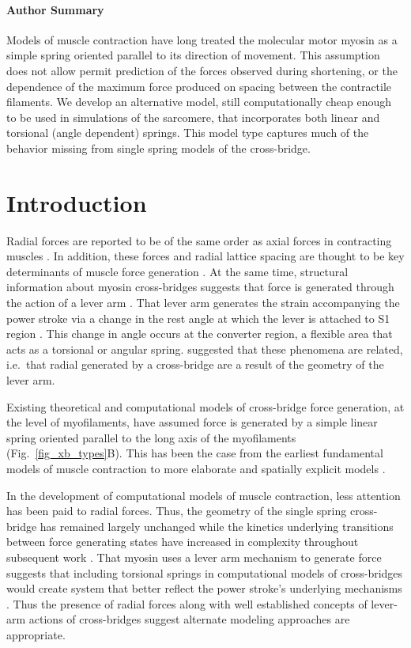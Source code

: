 \documentclass[]{article}
\begin{document}
\paragraph*{Author Summary} %
Models of muscle contraction have long treated the molecular motor myosin as a simple spring oriented parallel to its direction of movement. 
This assumption does not allow permit prediction of the forces observed during shortening, or the dependence of the maximum force produced on spacing between the contractile filaments.
We develop an alternative model, still computationally cheap enough to be used in simulations of the sarcomere, that incorporates both linear and torsional (angle dependent) springs. 
This model type captures much of the behavior missing from single spring models of the cross-bridge.


\section*{Introduction} %

Radial forces are reported to be of the same order as axial forces in contracting muscles \citep{Cecchi1990, Millman1998}. 
In addition, these forces and radial lattice spacing are thought to be key determinants of muscle force generation \citep{Fuchs2005}. 
At the same time, structural information about myosin cross-bridges suggests that force is generated through the action of a lever arm \citep{Rayment1993, Uyeda1996, Huxley2000}.
That lever arm generates the strain accompanying the power stroke via a change in the rest angle at which the lever is attached to S1 region \citep{Huxley2000, Houdusse2001}. 
This change in angle occurs at the converter region, a flexible area that acts as a torsional or angular spring. 
\citet{Schoenberg1980b} suggested that these phenomena are related, i.e.\ that radial generated by a cross-bridge are a result of the geometry of the lever arm. 

Existing theoretical and computational models of cross-bridge force generation, at the level of myofilaments, have assumed force is generated by a simple linear spring oriented parallel to the long axis of the myofilaments (Fig.~\ref{fig_xb_types}B).  
This has been the case from the earliest fundamental models of muscle contraction to more elaborate and spatially explicit models \citep{Huxley1957, Daniel1998, Chase2004, Tanner2007, Smith2008a, Campbell2009}.  

In the development of computational models of muscle contraction, less attention has been paid to radial forces. 
Thus, the geometry of the single spring cross-bridge has remained largely unchanged while the kinetics underlying transitions between force generating states have increased in complexity throughout subsequent work \citep{Pate1989, Daniel1998, Tanner2007}.
That myosin uses a lever arm mechanism to generate force suggests that including torsional springs in computational models of cross-bridges would create system that better reflect the power stroke's underlying mechanisms \citep{Houdusse2001}. 
Thus the presence of radial forces along with well established concepts of lever-arm actions of cross-bridges suggest alternate modeling approaches are appropriate.
\end{document}
